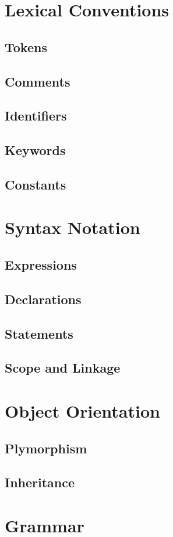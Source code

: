 \documentclass[12pt]{report}
\begin{document}
\section{Lexical Conventions}
\subsection{Tokens}
\subsection{Comments}
\subsection{Identifiers}
\subsection{Keywords}
\subsection{Constants}
\section{Syntax Notation}
\subsection{Expressions}
\subsection{Declarations}
\subsection{Statements}
\subsection{Scope and Linkage}
\section{Object Orientation}
\subsection{Plymorphism}
\subsection{Inheritance}
\section{Grammar}
\end{document}
